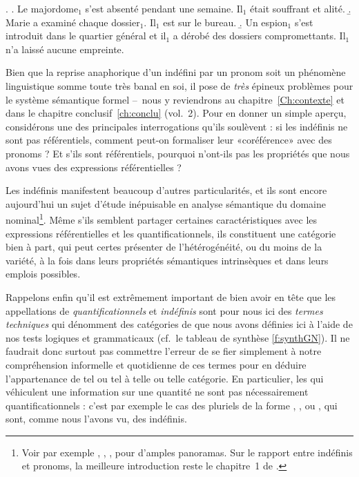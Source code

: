 \ex. 
\a. Le majordome$_1$ s'est absenté pendant une semaine. Il$_1$ était souffrant et alité.\label{x:reprER}
\b.  Marie a examiné chaque dossier$_1$. \zarb Il$_1$ est sur le bureau.\label{x:reprQu}
\b. Un espion$_1$ s'est introduit dans le quartier général et il$_1$ a dérobé des dossiers compromettants. Il$_1$ n'a laissé aucune empreinte.\label{x:reprIn}


Bien que la reprise anaphorique d'un indéfini par un pronom soit un phénomène linguistique somme toute très banal en soi, il pose de \emph{très} épineux problèmes pour le système sémantique formel --~nous y reviendrons au chapitre~\ref{Ch:contexte} et dans le chapitre conclusif~\ref{ch:conclu} (vol.~2).  Pour en donner un simple aperçu, considérons une des principales interrogations qu'ils soulèvent :
si les indéfinis ne sont pas référentiels, comment peut-on formaliser leur «coréférence» avec des pronoms ? Et s'ils sont référentiels, pourquoi n'ont-ils pas les propriétés que nous avons vues des expressions référentielles ? 

Les indéfinis manifestent beaucoup d'autres particularités, et ils sont encore aujourd'hui un
sujet d'étude inépuisable en analyse sémantique du domaine nominal\footnote{Voir par exemple \citet{Corblin:87}, \citet{Haspelmath:97}, \citet{Farkas:02salt}, \citet{SorinBeyssade:05} pour d'amples panoramas. 
Sur le rapport entre indéfinis et pronoms, la meilleure introduction reste le chapitre~1 de \citet{Heim:82}.}. 
Même s'ils semblent partager certaines caractéristiques avec les expressions référentielles et les {\GN} quantificationnels, ils constituent une catégorie bien à part, qui peut certes présenter de l'hétérogénéité, ou du moins de la variété, à la fois dans leurs propriétés sémantiques intrinsèques et dans leurs emplois possibles.




Rappelons enfin qu'il est  extrêmement important de bien avoir en tête que les appellations de \emph{quantificationnels} et \emph{indéfinis} sont pour nous ici des \emph{termes techniques} qui dénomment des catégories de {\GN} que nous avons définies ici à l'aide de nos tests logiques et grammaticaux (cf.\ le tableau de synthèse \ref{f:synthGN}). %
Il ne faudrait donc surtout pas commettre l'erreur de se fier simplement à notre compréhension informelle et quotidienne de ces termes pour en déduire l'appartenance de tel ou tel {\GN} à telle ou telle catégorie. En particulier, les {\GN} qui véhiculent une information sur une quantité ne sont pas nécessairement quantificationnels : c'est par exemple le cas des pluriels de la forme , ,  ou , qui sont, comme nous l'avons vu, des indéfinis. 




